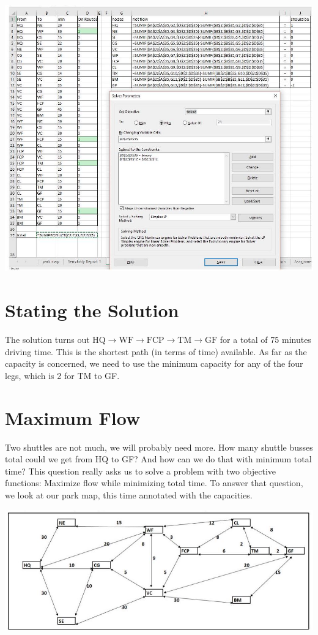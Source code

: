 \documentclass[10pt]{article}
\begin{document}
\includegraphics[max width=\textwidth]{2022_07_05_5945264bba2a5f6ba667g-48}

\section{Stating the Solution}
The solution turns out $\mathrm{HQ} \rightarrow \mathrm{WF} \rightarrow \mathrm{FCP} \rightarrow \mathrm{TM} \rightarrow \mathrm{GF}$ for a total of 75 minutes driving time. This is the shortest path (in terms of time) available. As far as the capacity is concerned, we need to use the minimum capacity for any of the four legs, which is 2 for TM to GF.

\section{Maximum Flow}
Two shuttles are not much, we will probably need more. How many shuttle busses total could we get from HQ to GF? And how can we do that with minimum total time? This question really asks us to solve a problem with two objective functions: Maximize flow while minimizing total time. To answer that question, we look at our park map, this time annotated with the capacities.

\includegraphics[max width=\textwidth]{2022_07_05_5945264bba2a5f6ba667g-49}
\end{document}

